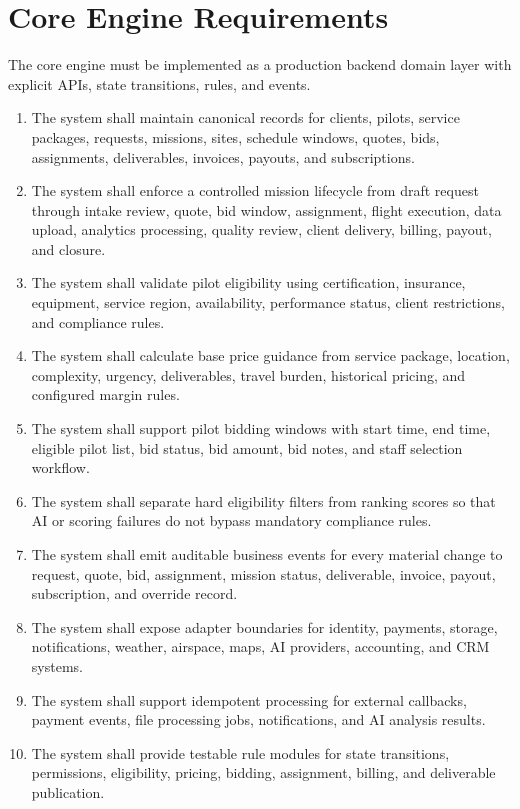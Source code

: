 \documentclass[11pt,a4paper]{article}
\begin{document}
\section{Core Engine Requirements}

The core engine must be implemented as a production backend domain layer with explicit APIs, state transitions, rules, and events.

\begin{enumerate}[leftmargin=*]
    \item The system shall maintain canonical records for clients, pilots, service packages, requests, missions, sites, schedule windows, quotes, bids, assignments, deliverables, invoices, payouts, and subscriptions.
    \item The system shall enforce a controlled mission lifecycle from draft request through intake review, quote, bid window, assignment, flight execution, data upload, analytics processing, quality review, client delivery, billing, payout, and closure.
    \item The system shall validate pilot eligibility using certification, insurance, equipment, service region, availability, performance status, client restrictions, and compliance rules.
    \item The system shall calculate base price guidance from service package, location, complexity, urgency, deliverables, travel burden, historical pricing, and configured margin rules.
    \item The system shall support pilot bidding windows with start time, end time, eligible pilot list, bid status, bid amount, bid notes, and staff selection workflow.
    \item The system shall separate hard eligibility filters from ranking scores so that AI or scoring failures do not bypass mandatory compliance rules.
    \item The system shall emit auditable business events for every material change to request, quote, bid, assignment, mission status, deliverable, invoice, payout, subscription, and override record.
    \item The system shall expose adapter boundaries for identity, payments, storage, notifications, weather, airspace, maps, AI providers, accounting, and CRM systems.
    \item The system shall support idempotent processing for external callbacks, payment events, file processing jobs, notifications, and AI analysis results.
    \item The system shall provide testable rule modules for state transitions, permissions, eligibility, pricing, bidding, assignment, billing, and deliverable publication.

\end{enumerate}
\end{document}
